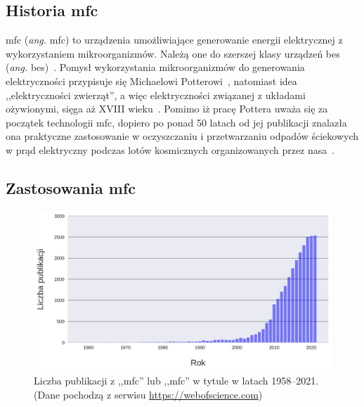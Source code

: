 \subsection{Historia \acrshort{mfc}}\label{subsec:historia}
\acrshort{mfc} (\textit{ang.} \acrlong{mfc}) to urządzenia umożliwiające
generowanie energii elektrycznej z wykorzystaniem mikroorganizmów.
Należą one do szerszej klasy urządzeń \acrshort{bes} (\textit{ang.}
\acrlong{bes})~\cite{Santoro2017}.
Pomysł wykorzystania mikroorganizmów do generowania elektryczności
przypisuje się Michaelowi Potterowi~\cite{Potter1911},
natomiast idea ,,elektryczności zwierząt'', a więc elektryczności
związanej z układami ożywionymi, sięga aż XVIII wieku~\cite{Santoro2017}.
Pomimo iż pracę Pottera uważa się za początek technologii \acrshort{mfc},
dopiero po ponad 50 latach od jej publikacji
znalazła ona praktyczne zastosowanie w oczyszczaniu i przetwarzaniu
odpadów ściekowych w prąd elektryczny podczas lotów kosmicznych
organizowanych przez \acrshort{nasa}~\cite{Slate2019}.

\subsection{Zastosowania \acrshort{mfc}}\label{subsec:zastosowania-mfc}

\begin{figure}[!b]
    \centering
    \includegraphics[width=12cm]{figures/publications}
    \caption{
        Liczba publikacji z ,,\acrshort{mfc}'' lub
        ,,\acrlong{mfc}'' w tytule w latach 1958--2021.
        (Dane pochodzą z serwisu \url{https://webofscience.com})
    }
    \label{fig:1}
\end{figure}

